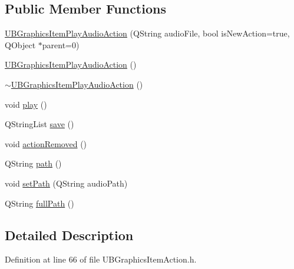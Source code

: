 \subsection*{Public Member Functions}
\begin{DoxyCompactItemize}
\item 
\hyperlink{class_u_b_graphics_item_play_audio_action_aa8e6fa6ee026df061cb7b27a30112a94}{U\-B\-Graphics\-Item\-Play\-Audio\-Action} (Q\-String audio\-File, bool is\-New\-Action=true, Q\-Object $\ast$parent=0)
\item 
\hyperlink{class_u_b_graphics_item_play_audio_action_ae5197d1f69ed57b69c4daa89672d7724}{U\-B\-Graphics\-Item\-Play\-Audio\-Action} ()
\item 
\hyperlink{class_u_b_graphics_item_play_audio_action_a75f4e8e27b83dd02149f27b605dc731c}{$\sim$\-U\-B\-Graphics\-Item\-Play\-Audio\-Action} ()
\item 
void \hyperlink{class_u_b_graphics_item_play_audio_action_a6c05f4ede77e8f4e8a34382f4f7795d2}{play} ()
\item 
Q\-String\-List \hyperlink{class_u_b_graphics_item_play_audio_action_ac6546242e1e582801553d6d325c30482}{save} ()
\item 
void \hyperlink{class_u_b_graphics_item_play_audio_action_a978fb62685445d42c96d1145f9d89aca}{action\-Removed} ()
\item 
Q\-String \hyperlink{class_u_b_graphics_item_play_audio_action_a5110f946bde4e0b42ea77f44d6ccb9dd}{path} ()
\item 
void \hyperlink{class_u_b_graphics_item_play_audio_action_a3824db861a7b06327a351955a0276bf9}{set\-Path} (Q\-String audio\-Path)
\item 
Q\-String \hyperlink{class_u_b_graphics_item_play_audio_action_a6ef456f8260dca2d6144ae33c2a3920b}{full\-Path} ()
\end{DoxyCompactItemize}


\subsection{Detailed Description}


Definition at line 66 of file U\-B\-Graphics\-Item\-Action.\-h.



